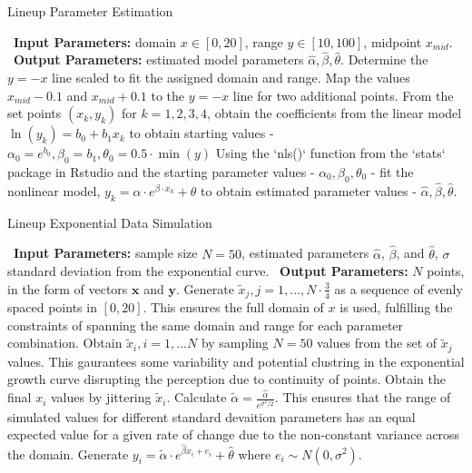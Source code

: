 \documentclass[print]{nuthesis}
\begin{document}
\begin{algorithm}
  \caption{Lineup Parameter Estimation}
  \begin{algorithmic}[1]
    \Statex \textbullet~\textbf{Input Parameters:} domain $x\in[0,20]$, range $y\in[10,100]$, midpoint $x_{mid}$.
    \Statex \textbullet~\textbf{Output Parameters:} estimated model parameters $\hat\alpha, \hat\beta, \hat\theta$.
    \State Determine the $y=-x$ line scaled to fit the assigned domain and range.
    \State Map the values $x_{mid} - 0.1$ and $x_{mid} + 0.1$ to the $y=-x$ line for two additional points.
    \State From the set points $(x_k, y_k)$ for $k = 1,2,3,4$, obtain the coefficients from the linear model $\ln(y_k) = b_0 +b_1x_k$ to obtain starting values - $\alpha_0 = e^{b_0}, \beta_0 =  b_1, \theta_0 = 0.5\cdot \min(y)$
    \State Using the `nls()` function from the `stats` package in Rstudio and the starting parameter values - $\alpha_0, \beta_0, \theta_0$ - fit the nonlinear model, $y_k = \alpha\cdot e^{\beta\cdot x_k}+\theta$ to obtain estimated parameter values - $\hat\alpha, \hat\beta, \hat\theta.$
  \end{algorithmic}
\end{algorithm}

\begin{algorithm}
  \caption{Lineup Exponential Data Simulation}
  \begin{algorithmic}[1]
    \Statex \textbullet~\textbf{Input Parameters:} sample size $N = 50$, estimated parameters $\hat\alpha$, $\hat\beta$, and $\hat\theta$, $\sigma$ standard deviation from the exponential curve.
    \Statex \textbullet~\textbf{Output Parameters:} $N$ points, in the form of vectors $\mathbf{x}$ and $\mathbf{y}$.
    \State Generate $\tilde x_j, j = 1,..., N\cdot \frac{3}{4}$ as a sequence of evenly spaced points in $[0,20]$. This ensures the full domain of $x$ is used, fulfilling the constraints of spanning the same domain and range for each parameter combination.
    \State Obtain $\tilde x_i, i = 1,...N$ by sampling $N = 50$ values from the set of $\tilde x_j$ values. This gaurantees some variability and potential clustring in the exponential growth curve disrupting the perception due to continuity of points.
    \State Obtain the final $x_i$ values by jittering $\tilde x_i$.
    \State Calculate $\tilde\alpha = \frac{\hat\alpha}{e^{\sigma^2/2}}.$ This ensures that the range of simulated values for different standard devaition parameters has an equal expected value for a given rate of change due to the non-constant variance across the domain.
    \State Generate $y_i = \tilde\alpha\cdot e^{\hat\beta x_i + e_i}+\hat\theta$ where $e_i\sim N(0,\sigma^2).$
  \end{algorithmic}
\end{algorithm}
\end{document}
